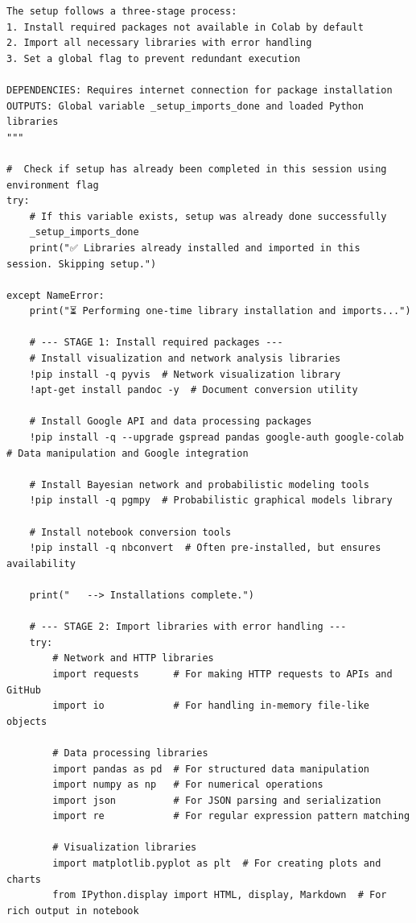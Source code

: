 \documentclass[
  11pt,
  letterpaper,
]{book}
\begin{document}
\begin{verbatim}
The setup follows a three-stage process:
1. Install required packages not available in Colab by default
2. Import all necessary libraries with error handling
3. Set a global flag to prevent redundant execution

DEPENDENCIES: Requires internet connection for package installation
OUTPUTS: Global variable _setup_imports_done and loaded Python libraries
"""

#  Check if setup has already been completed in this session using environment flag
try:
    # If this variable exists, setup was already done successfully
    _setup_imports_done
    print("✅ Libraries already installed and imported in this session. Skipping setup.")

except NameError:
    print("⏳ Performing one-time library installation and imports...")

    # --- STAGE 1: Install required packages ---
    # Install visualization and network analysis libraries
    !pip install -q pyvis  # Network visualization library
    !apt-get install pandoc -y  # Document conversion utility

    # Install Google API and data processing packages
    !pip install -q --upgrade gspread pandas google-auth google-colab  # Data manipulation and Google integration

    # Install Bayesian network and probabilistic modeling tools
    !pip install -q pgmpy  # Probabilistic graphical models library

    # Install notebook conversion tools
    !pip install -q nbconvert  # Often pre-installed, but ensures availability

    print("   --> Installations complete.")

    # --- STAGE 2: Import libraries with error handling ---
    try:
        # Network and HTTP libraries
        import requests      # For making HTTP requests to APIs and GitHub
        import io            # For handling in-memory file-like objects

        # Data processing libraries
        import pandas as pd  # For structured data manipulation
        import numpy as np   # For numerical operations
        import json          # For JSON parsing and serialization
        import re            # For regular expression pattern matching

        # Visualization libraries
        import matplotlib.pyplot as plt  # For creating plots and charts
        from IPython.display import HTML, display, Markdown  # For rich output in notebook


\end{verbatim}
\end{document}
